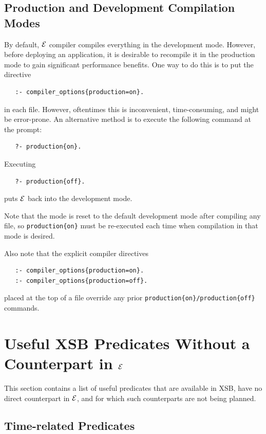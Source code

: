\documentclass[11pt]{article}
\newcommand{\ERGO}{\mbox{\ensuremath{\cal{E}}\smaller{{\sc{RGO}}}}\xspace}
\newcommand{\FLSYSTEM}{\ERGO}
\begin{document}
\subsection{Production and Development Compilation  Modes}
\label{sec-production-shell}

By default, \FLSYSTEM compiler compiles everything in the development
mode. However, before deploying an application, it is desirable to
recompile it in the production mode to gain significant performance benefits.
One way to do this is to put the directive
\begin{verbatim}
   :- compiler_options{production=on}.
\end{verbatim}
in each file. However, oftentimes this is inconvenient, time-consuming, and might be
error-prone. An alternative method is to execute the following command at
the prompt:
\begin{verbatim}
   ?- production{on}.
\end{verbatim}
Executing
\begin{verbatim}
   ?- production{off}.
\end{verbatim}
puts \FLSYSTEM back into the development mode.

Note that the mode is reset to the default development mode after compiling
any file, so \texttt{production\{on\}} must be re-executed each time
when compilation in that mode is desired.

Also note that the explicit compiler directives
\begin{verbatim}
   :- compiler_options{production=on}.
   :- compiler_options{production=off}.
\end{verbatim}
placed at the top of a file override any prior
\texttt{production\{on\}/production\{off\}} commands. 
 
\section{Useful XSB Predicates Without a Counterpart in \FLSYSTEM}
\label{sec-useful-XSB-preds}

This section contains a list of useful predicates that are available in
XSB, have no direct counterpart in \FLSYSTEM, and for which such
counterparts are not being planned.

\subsection{Time-related Predicates}
\end{document}
